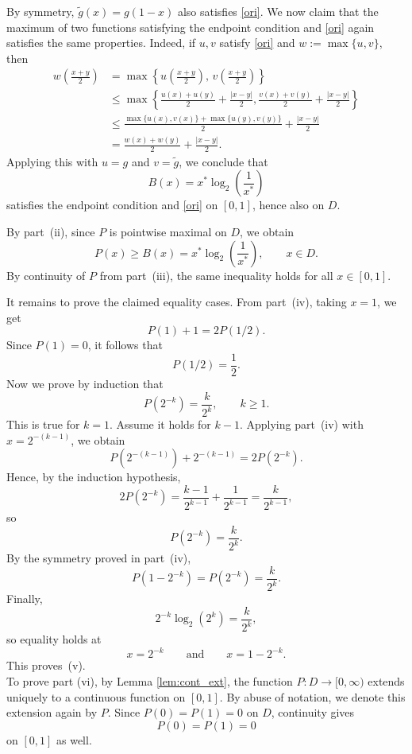 \documentclass[11pt]{amsart}
\theoremstyle{definition}
\renewcommand{\1}{{\mathbbm{1}}}
\begin{document}
By symmetry, $\widetilde g(x)=g(1-x)$ also satisfies \eqref{ori}. We now claim that the
maximum of two functions satisfying the endpoint condition and \eqref{ori} again satisfies
the same properties. Indeed, if $u,v$ satisfy \eqref{ori} and $w:=\max\{u,v\}$, then
\begin{align*}
w\!\left(\frac{x+y}{2}\right)
&=\max\!\left\{u\!\left(\frac{x+y}{2}\right),\,v\!\left(\frac{x+y}{2}\right)\right\}\\
&\le
\max\!\left\{
\frac{u(x)+u(y)}{2}+\frac{|x-y|}{2},
\frac{v(x)+v(y)}{2}+\frac{|x-y|}{2}
\right\}\\
&\le
\frac{\max\{u(x),v(x)\}+\max\{u(y),v(y)\}}{2}+\frac{|x-y|}{2}\\
&=
\frac{w(x)+w(y)}{2}+\frac{|x-y|}{2}.
\end{align*}
Applying this with $u=g$ and $v=\widetilde g$, we conclude that
\[
B(x)=x^*\log_2\!\left(\frac1{x^*}\right)
\]
satisfies the endpoint condition and \eqref{ori} on $[0,1]$, hence also on $D$.

By part~(ii), since $P$ is pointwise maximal on $D$, we obtain
\[
P(x)\ge B(x)=x^*\log_2\!\left(\frac1{x^*}\right),
\qquad x\in D.
\]
By continuity of $P$ from part~(iii), the same inequality holds for all $x\in[0,1]$.

It remains to prove the claimed equality cases. From part~(iv), taking $x=1$, we get
\[
P(1)+1=2P(1/2).
\]
Since $P(1)=0$, it follows that
\[
P(1/2)=\frac12.
\]
Now we prove by induction that
\[
P(2^{-k})=\frac{k}{2^k},\qquad k\ge1.
\]
This is true for $k=1$. Assume it holds for $k-1$. Applying part~(iv) with
$x=2^{-(k-1)}$, we obtain
\[
P(2^{-(k-1)})+2^{-(k-1)}=2P(2^{-k}).
\]
Hence, by the induction hypothesis,
\[
2P(2^{-k})
=
\frac{k-1}{2^{k-1}}+\frac{1}{2^{k-1}}
=
\frac{k}{2^{k-1}},
\]
so
\[
P(2^{-k})=\frac{k}{2^k}.
\]
By the symmetry proved in part~(iv),
\[
P(1-2^{-k})=P(2^{-k})=\frac{k}{2^k}.
\]
Finally,
\[
2^{-k}\log_2(2^k)=\frac{k}{2^k},
\]
so equality holds at
\[
x=2^{-k}
\qquad\text{and}\qquad
x=1-2^{-k}.
\]
This proves~(v).\\

To prove part  (vi), by Lemma \ref{lem:cont_ext}, the function $P:D\to[0,\infty)$ extends uniquely to a continuous
function on $[0,1]$. By abuse of notation, we denote this extension again by $P$.
Since $P(0)=P(1)=0$ on $D$, continuity gives
\[
P(0)=P(1)=0
\]
on $[0,1]$ as well.
\end{document}
